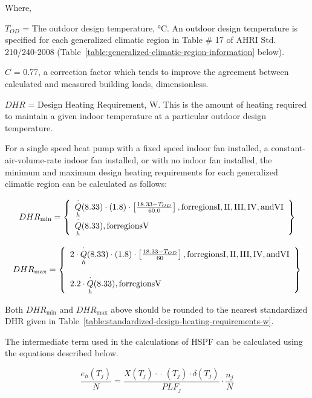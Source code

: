 Where,

\(T_{OD}\) = The outdoor design temperature, °C. An outdoor design temperature is specified for each generalized climatic region in Table \# 17 of AHRI Std. 210/240-2008 (Table~\ref{table:generalized-climatic-region-information} below).

\(C\) = 0.77, a correction factor which tends to improve the agreement between calculated and measured building loads, dimensionless.

\(DHR\) = Design Heating Requirement, W. This is the amount of heating required to maintain a given indoor temperature at a particular outdoor design temperature.

For a single speed heat pump with a fixed speed indoor fan installed, a constant-air-volume-rate indoor fan installed, or with no indoor fan installed, the minimum and maximum design heating requirements for each generalized climatic region can be calculated as follows:

\begin{equation}
  DHR_{\min } =
  \left\{ 
    \begin{array}{l}
      {\mathop Q\limits^ \cdot_h}(8.33) \cdot (1.8) \cdot \left[ {\frac{{18.33 - {T_{OD}}}}{{60.0}}} \right] , {\rm{ for regions I,II,III,IV, and VI}} \\
      {\mathop Q\limits^ \cdot_h}(8.33),{\rm{                     for regions V}}
    \end{array}
  \right\}
\end{equation}

\begin{equation}
DH{R_{\max }} = \left\{ \begin{array}{l}2 \cdot {\mathop Q\limits^ \cdot_h}(8.33) \cdot (1.8) \cdot \left[ {\frac{{18.33 - {T_{OD}}}}{{60}}} \right],{\rm{ for regions I,II,III,IV, and VI}}\\\\2.2 \cdot {\mathop Q\limits^ \cdot_h}(8.33),{\rm{                     for regions V}}\end{array} \right\}
\end{equation}

Both \(DH{R_{\min }}\) and \(DH{R_{\max }}\) above should be rounded to the nearest standardized DHR given in Table~\ref{table:standardized-design-heating-requirements-w}.

The intermediate term used in the calculations of HSPF can be calculated using the equations described below.

\begin{equation}
\frac{{{e_h}({T_j})}}{N} = \frac{{X({T_j}) \cdot \mathop {{E_h}}\limits^ \cdot  ({T_j}) \cdot \delta ({T_j})}}{{PL{F_j}}} \cdot \frac{{{n_j}}}{N}
\end{equation}

